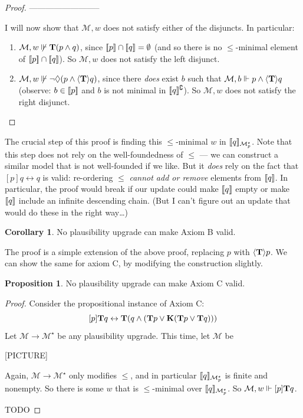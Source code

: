 \documentclass[letterpaper]{article}
\theoremstyle{definition}
\newtheorem{corollary}{Corollary}
\newtheorem{proposition}{Proposition}
\newcommand{\semantics}[1]{[\![\mbox{\em $ #1 $\/}]\!]}
\newcommand{\Model}{\mathcal{M}}
\newcommand{\Typ}[1]{\textrm{\textup{\textbf{T}}} #1}
\newcommand{\Know}[1]{\textrm{\textup{\textbf{K}}} #1}
\newcommand{\Update}[1]{[#1]}
\newcommand{\diaTyp}[1]{\langle \textrm{\textup{\textbf{T}}} \rangle #1}
\begin{document}
\begin{proof}
    
    --------------------------

    I will now show that $\Model, w$ does not satisfy either of the disjuncts.  In particular:
    \begin{enumerate}
        \item $\Model, w \not \Vdash \Typ{(p \land q)}$, since $\semantics{p} \cap \semantics{q} = \emptyset$ (and so there is no ${\leq}$-minimal element of $\semantics{p} \cap \semantics{q}$).  So $\Model, w$ does not satisfy the left disjunct.
        
        \item $\Model, w \not \Vdash \neg\Diamond(p \land \diaTyp{q})$, since there \emph{does} exist $b$ such that $\Model, b \Vdash p \land \diaTyp{q}$ (observe: $b \in \semantics{p}$ and $b$ is not minimal in $\semantics{q}^\complement$).  So $\Model, w$ does not satisfy the right disjunct.\qedhere
    \end{enumerate}
\end{proof}

The crucial step of this proof is finding this ${\leq}$-minimal $w$ in $\semantics{q}_{\Model^\star_p}$.  Note that this step does not rely on the well-foundedness of $\leq$ --- we can construct a similar model that is not well-founded if we like.  But it \emph{does} rely on the fact that $\Update{p} q \leftrightarrow q$ is valid: re-ordering $\leq$ \emph{cannot add or remove} elements from $\semantics{q}$.  In particular, the proof would break if our update could make $\semantics{q}$ empty or make $\semantics{q}$ include an infinite descending chain.  (But I can't figure out an update that would do these in the right way\ldots)

\begin{corollary}
    No plausibility upgrade can make Axiom B valid.
\end{corollary}

The proof is a simple extension of the above proof, replacing $p$ with $\diaTyp{p}$.  We can show the same for axiom C, by modifying the construction slightly.

\begin{proposition}
    No plausibility upgrade can make Axiom C valid.
\end{proposition}
\begin{proof}
    Consider the propositional instance of Axiom C:
    \[
        \Update{p} \Typ{q} \leftrightarrow 
        \Typ{(q \land (\Typ{p} \lor \Know{(\Typ{p} \lor \Typ{q})}))}
    \]
    Let $\Model \to \Model^\star$ be any plausibility upgrade.  This time, let $\Model$ be
    
    [PICTURE]

    Again, $\Model \to \Model^\star$ only modifies $\leq$, and in particular $\semantics{q}_{\Model^\star_p}$ is finite and nonempty.  So there is some $w$ that is ${\leq}$-minimal over $\semantics{q}_{\Model^\star_p}$.  So $\Model, w \Vdash \Update{p} \Typ{q}$.  
    
    TODO
\end{proof}

\printbibliography
\end{document}
